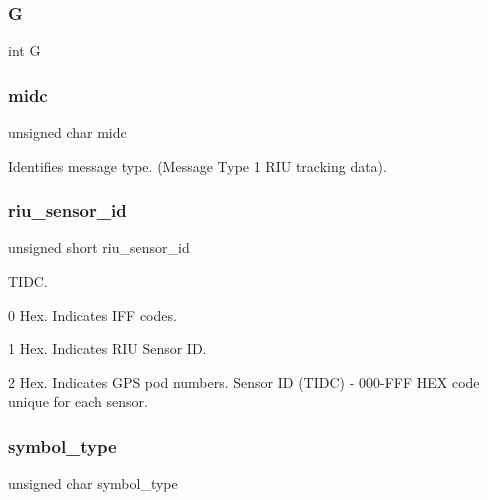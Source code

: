 \subsubsection{\texorpdfstring{G}{G}}
{\footnotesize\ttfamily int G}

\mbox{\label{struct_m_i_d_c__01_a4e26ddc4da6da6fea6901c0caee2e7fd}} 
\subsubsection{\texorpdfstring{midc}{midc}}
{\footnotesize\ttfamily unsigned char midc}

Identifies message type. (Message Type 1 R\+IU tracking data). \mbox{\label{struct_m_i_d_c__01_a69763ba083a498ead8e43afecc94b4d7}} 
\subsubsection{\texorpdfstring{riu\+\_\+sensor\+\_\+id}{riu\_sensor\_id}}
{\footnotesize\ttfamily unsigned short riu\+\_\+sensor\+\_\+id}

T\+I\+DC.
\begin{DoxyItemize}
\item 0 Hex. Indicates I\+FF codes.
\item 1 Hex. Indicates R\+IU Sensor ID.
\item 2 Hex. Indicates G\+PS pod numbers. Sensor ID (T\+I\+DC) -\/ 000-\/\+F\+FF H\+EX code unique for each sensor. 
\end{DoxyItemize}\mbox{\label{struct_m_i_d_c__01_a10ae4966d28a3e8356b329080e73e037}} 
\subsubsection{\texorpdfstring{symbol\+\_\+type}{symbol\_type}}
{\footnotesize\ttfamily unsigned char symbol\+\_\+type}


